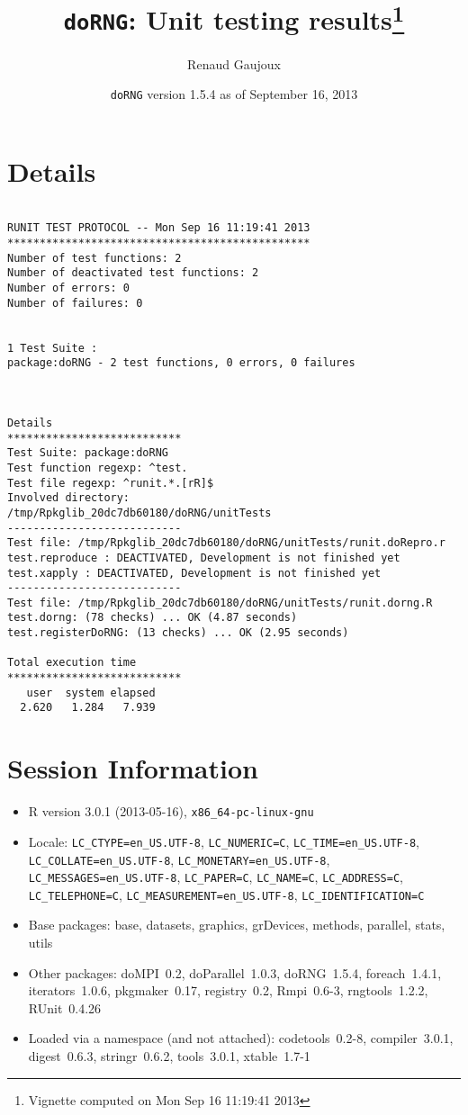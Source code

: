 \documentclass[10pt]{article}\usepackage[]{graphicx}\usepackage[]{color}
\author{Renaud Gaujoux}
\title{\texttt{doRNG}: Unit testing results\footnote{Vignette computed  on Mon Sep 16 11:19:41 2013}}
\date{\texttt{doRNG} version 1.5.4 as of September 16, 2013}
\begin{document}
\maketitle

\section{Details}
\begin{verbatim}

RUNIT TEST PROTOCOL -- Mon Sep 16 11:19:41 2013 
*********************************************** 
Number of test functions: 2 
Number of deactivated test functions: 2 
Number of errors: 0 
Number of failures: 0 

 
1 Test Suite : 
package:doRNG - 2 test functions, 0 errors, 0 failures



Details 
*************************** 
Test Suite: package:doRNG 
Test function regexp: ^test. 
Test file regexp: ^runit.*.[rR]$ 
Involved directory: 
/tmp/Rpkglib_20dc7db60180/doRNG/unitTests 
--------------------------- 
Test file: /tmp/Rpkglib_20dc7db60180/doRNG/unitTests/runit.doRepro.r 
test.reproduce : DEACTIVATED, Development is not finished yet
test.xapply : DEACTIVATED, Development is not finished yet
--------------------------- 
Test file: /tmp/Rpkglib_20dc7db60180/doRNG/unitTests/runit.dorng.R 
test.dorng: (78 checks) ... OK (4.87 seconds)
test.registerDoRNG: (13 checks) ... OK (2.95 seconds)

Total execution time
***************************
   user  system elapsed 
  2.620   1.284   7.939 

\end{verbatim}

\section*{Session Information}
\begin{itemize}\raggedright
  \item R version 3.0.1 (2013-05-16), \verb|x86_64-pc-linux-gnu|
  \item Locale: \verb|LC_CTYPE=en_US.UTF-8|, \verb|LC_NUMERIC=C|, \verb|LC_TIME=en_US.UTF-8|, \verb|LC_COLLATE=en_US.UTF-8|, \verb|LC_MONETARY=en_US.UTF-8|, \verb|LC_MESSAGES=en_US.UTF-8|, \verb|LC_PAPER=C|, \verb|LC_NAME=C|, \verb|LC_ADDRESS=C|, \verb|LC_TELEPHONE=C|, \verb|LC_MEASUREMENT=en_US.UTF-8|, \verb|LC_IDENTIFICATION=C|
  \item Base packages: base, datasets, graphics, grDevices, methods,
    parallel, stats, utils
  \item Other packages: doMPI~0.2, doParallel~1.0.3, doRNG~1.5.4,
    foreach~1.4.1, iterators~1.0.6, pkgmaker~0.17, registry~0.2,
    Rmpi~0.6-3, rngtools~1.2.2, RUnit~0.4.26
  \item Loaded via a namespace (and not attached): codetools~0.2-8,
    compiler~3.0.1, digest~0.6.3, stringr~0.6.2, tools~3.0.1,
    xtable~1.7-1
\end{itemize}
\end{document}
